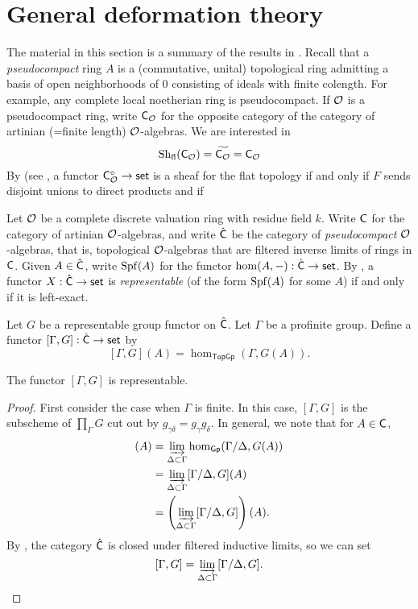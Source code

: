 \documentclass[phd,cornellheadings,draft]{cornell}
\begin{document}
\section{General deformation theory}

The material in this section is a summary of the results in 
\cite[7\textsubscript{b} \S0--2]{sga3-i}. Recall that a \emph{pseudocompact} 
ring $A$ is a (commutative, unital) topological ring admitting a basis of 
open neighborhoods of $0$ consisting of ideals with finite colength. For 
example, any complete local noetherian ring is pseudocompact. If 
$\mathcal{O}$ is a pseudocompact ring, write $\mathsf{C}_{\mathcal{O}}$ for the opposite category 
of the category of artinian (=finite length) $\mathcal{O}$-algebras. We are interested 
in 
\[
  \mathrm{Sh}_\mathrm{fl}(\mathsf{C}_{\mathcal{O}}) = \widetilde{\mathsf{C}_{\mathcal{O}}} = \mathsf{C}_{\mathcal{O}}
\]
By \cite[IV 4.3.5]{sga3-i} (see \cite[VII\textsubscript{B} 1.5]{sga3-i}, a 
functor $\mathsf{C}_{\mathcal{O}}^\circ\to\mathsf{set}$ is a sheaf for the flat topology if and 
only if $F$ sends disjoint unions to direct products and if 

Let $\mathcal{O}$ be a complete discrete valuation ring with residue field $k$. Write 
$\mathsf{C}$ for the category of artinian $\mathcal{O}$-algebras, and write 
$\hat{\mathsf{C}}$ be the category of \emph{pseudocompact} $\mathcal{O}$-algebras, that is, 
topological $\mathcal{O}$-algebras that are filtered inverse limits of rings in 
$\mathsf{C}$. Given $A\in \hat{\mathsf{C}}$, write $\operatorname{Spf}(A)$ for the 
functor $\hom(A,-):\hat{\mathsf{C}}\to \mathsf{set}$. By 
\cite[$\mathrm{VII_B}$ \S 0.4]{sga3-i}, a functor $X:\hat{\mathsf{C}}\to \mathsf{set}$ is 
\emph{representable} (of the form $\operatorname{Spf}(A)$ for some $A$) if and 
only if it is left-exact. 

Let $G$ be a representable group functor on $\hat{\mathsf{C}}$. 
Let $\Gamma$ be a profinite group. 
Define a functor $[\Gamma,G]:\hat{\mathsf{C}}\to \mathsf{set}$ by 
\[
  [\Gamma,G](A) = \hom_\mathsf{TopGp}(\Gamma,G(A)) .
\]
\begin{proposition}
The functor $[\Gamma,G]$ is representable. 
\end{proposition}
\begin{proof}
First consider the case when $\Gamma$ is finite. In this case, 
$[\Gamma,G]$ is the subscheme of $\prod_\Gamma G$ cut out by 
$g_{\gamma\delta} = g_\gamma g_\delta$. In general, we note that for 
$A\in \mathsf{C}$, 
\begin{align*}
  [\Gamma,G](A) 
    &= \varinjlim_{\Delta\subset \Gamma} \hom_\mathsf{Gp}(\Gamma/\Delta,G(A)) \\
    &= \varinjlim_{\Delta\subset \Gamma} [\Gamma/\Delta,G](A) \\
    &= \left(\varinjlim_{\Delta\subset \Gamma} [\Gamma/\Delta,G]\right)(A) .
\end{align*}
By \cite[$\mathrm{VII_B}$ 1.2.B]{sga3-i}, the category $\hat{\mathsf{C}}$ is 
closed under filtered inductive limits, so we can set 
\[
  [\Gamma,G] = \varinjlim_{\Delta\subset \Gamma} [\Gamma/\Delta,G] .
\]
\end{proof}
\end{document}
